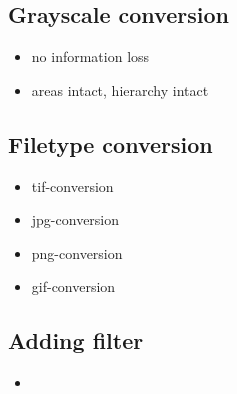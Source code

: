 \subsection{Grayscale conversion}
\begin{itemize}
    \item no information loss
    \item areas intact, hierarchy intact
\end{itemize}

\subsection{Filetype conversion}
\begin{itemize}
    \item tif-conversion
    \item jpg-conversion
    \item png-conversion
    \item gif-conversion
\end{itemize}

\subsection{Adding filter}
\begin{itemize}
    \item
\end{itemize}
